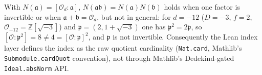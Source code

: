 \begin{remark}
  \label{notation-nonmult}
  With $N(\mathfrak{a}) = [\mathcal{O}_d : \mathfrak{a}]$,
  $N(\mathfrak{a}\mathfrak{b}) = N(\mathfrak{a})N(\mathfrak{b})$ holds when one factor is
  invertible or when $\mathfrak{a} + \mathfrak{b} = \mathcal{O}_d$, but not in general:
  for $d = -12$ ($D = -3$, $f = 2$, $\mathcal{O}_{-12} = \mathbb{Z}[\sqrt{-3}]$) and
  $\mathfrak{p} = (2, 1 + \sqrt{-3})$ one has $\mathfrak{p}^2 = 2\mathfrak{p}$, so
  $[\mathcal{O} : \mathfrak{p}^2] = 8 \neq 4 = [\mathcal{O} : \mathfrak{p}]^2$, and
  $\mathfrak{p}$ is not invertible. Consequently the Lean index layer defines the index
  as the raw quotient cardinality (\texttt{Nat.card}, Mathlib's
  \texttt{Submodule.cardQuot} convention), not through Mathlib's Dedekind-gated
  \texttt{Ideal.absNorm} API.
\end{remark}
